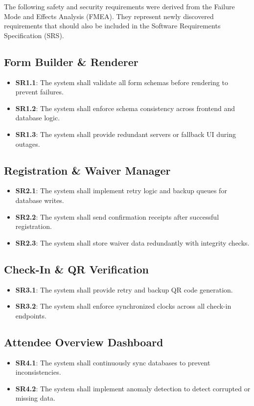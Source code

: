 \documentclass{article}
\begin{document}
The following safety and security requirements were derived from the Failure Mode and Effects Analysis (FMEA). 
They represent newly discovered requirements that should also be included in the Software Requirements Specification (SRS).

\subsection{Form Builder \& Renderer}
\begin{itemize}
    \item \textbf{SR1.1}: The system shall validate all form schemas before rendering to prevent failures.
    \item \textbf{SR1.2}: The system shall enforce schema consistency across frontend and database logic.
    \item \textbf{SR1.3}: The system shall provide redundant servers or fallback UI during outages.
\end{itemize}

\subsection{Registration \& Waiver Manager}
\begin{itemize}
    \item \textbf{SR2.1}: The system shall implement retry logic and backup queues for database writes.
    \item \textbf{SR2.2}: The system shall send confirmation receipts after successful registration.
    \item \textbf{SR2.3}: The system shall store waiver data redundantly with integrity checks.
\end{itemize}

\subsection{Check-In \& QR Verification}
\begin{itemize}
    \item \textbf{SR3.1}: The system shall provide retry and backup QR code generation.
    \item \textbf{SR3.2}: The system shall enforce synchronized clocks across all check-in endpoints.
\end{itemize}

\subsection{Attendee Overview Dashboard}
\begin{itemize}
    \item \textbf{SR4.1}: The system shall continuously sync databases to prevent inconsistencies.
    \item \textbf{SR4.2}: The system shall implement anomaly detection to detect corrupted or missing data.
\end{itemize}
\end{document}
